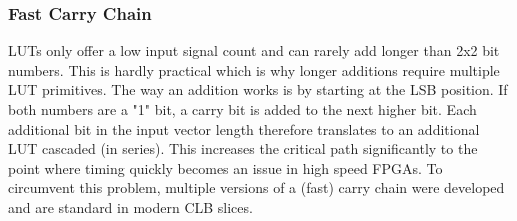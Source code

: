 \subsubsection{Fast Carry Chain}

LUTs only offer a low input signal count and can rarely add longer than 2x2 bit numbers.
This is hardly practical which is why longer additions require multiple LUT primitives.
The way an addition works is by starting at the LSB position.
If both numbers are a "1" bit, a carry bit is added to the next higher bit.
Each additional bit in the input vector length therefore translates to an additional LUT cascaded (in series).
This increases the critical path significantly to the point where timing quickly becomes an issue in high speed FPGAs.
To circumvent this problem, multiple versions of a (fast) carry chain were developed and are standard in modern CLB slices.
